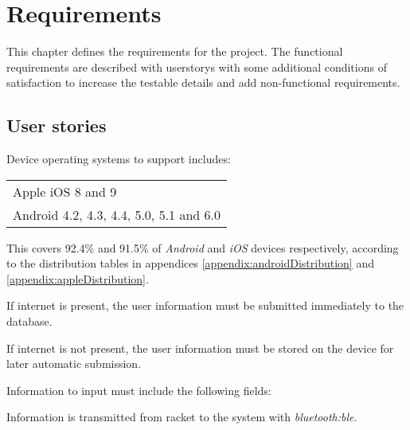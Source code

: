 \chapter{Requirements}\label{ch:Requirements}
This chapter defines the requirements for the project. 
The functional requirements are described with \glspl{userstory} with some additional conditions of satisfaction to increase the testable details and add non-functional requirements.

\section*{User stories}


Device operating systems to support includes: \newline
\begin{tabularx}{\textwidth}{X}
    Apple iOS 8 and 9 \\
    Android 4.2, 4.3, 4.4, 5.0, 5.1 and 6.0
\end{tabularx}

This covers 92.4\% and 91.5\% of \textit{Android} and \textit{iOS} devices respectively, according to the distribution tables in appendices \ref{appendix:androidDistribution} and \ref{appendix:appleDistribution}.


If internet is present, the user information must be submitted immediately to the database.

If internet is not present, the user information must be stored on the device for later automatic submission.

Information to input must include the following fields:\newline
{}


Information is transmitted from racket to the system with \textit{\gls{bluetooth:ble}}. 


